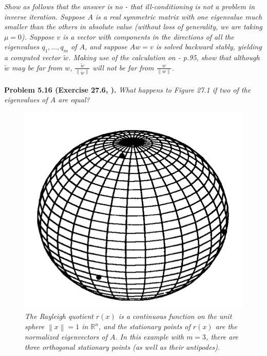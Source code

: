 \documentclass[a4paper,oneside]{book}
\numberwithin{equation}{chapter}
\begin{document}
\textit{Show as follows that the answer is no - that ill-conditioning is not a problem in inverse iteration. Suppose $A$ is a real symmetric matrix with one eigenvalue much smaller than the others in absolute value (without loss of generality, we are taking $\mu =0$). Suppose $v$ is a vector with components in the directions of all the eigenvalues $q_1,\ldots,q_m$ of $A$, and suppose $Aw=v$ is solved backward stably, yielding a computed vector $\tilde w$. Making use of the calculation on \cite{1} - p.95, show that although $\tilde w$ may be far from $w$, $\frac{{\tilde w}}{{\left\| {\tilde w} \right\|}}$ will not be far from $\frac{w}{{\left\| w \right\|}}$.}\\
\\
\textbf{Problem 5.16 (Exercise 27.6, \cite{1}).} \textit{What happens to Figure 27.1 if two of the eigenvalues of $A$ are equal?}
\begin{figure}[H]
	\centering
	\includegraphics[scale=0.35]{8}
	\caption{\textit{The Rayleigh quotient $r\left(x\right)$ is a continuous function on the unit sphere $\left\|x\right\|=1$ in $\mathbb{R}^n$, and the stationary points of $r\left(x\right)$ are the normalized eigenvectors of $A$. In this example with $m=3$, there are three orthogonal stationary points (as well as their antipodes).}}
\end{figure}
\end{document}
